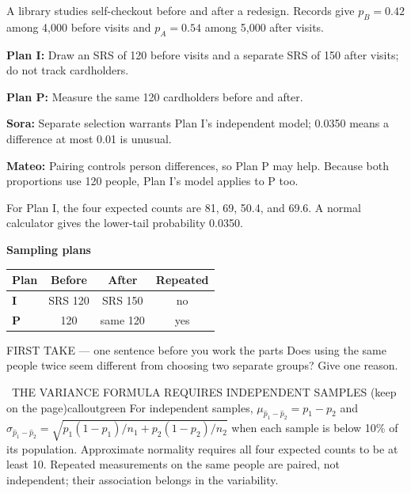 \documentclass[11pt]{article}
\begin{document}


A library studies self-checkout before and after a redesign. Records give $p_B=0.42$ among 4{,}000 before visits and $p_A=0.54$ among 5{,}000 after visits.\par\smallskip \textbf{Plan I:} Draw an SRS of 120 before visits and a separate SRS of 150 after visits; do not track cardholders.\par \textbf{Plan P:} Measure the same 120 cardholders before and after.\par\smallskip \textbf{Sora:} Separate selection warrants Plan I's independent model; 0.0350 means a difference at most 0.01 is unusual.\par \textbf{Mateo:} Pairing controls person differences, so Plan P may help. Because both proportions use 120 people, Plan I's model applies to P too.\par\smallskip For Plan I, the four expected counts are 81, 69, 50.4, and 69.6. A normal calculator gives the lower-tail probability 0.0350.\par
\begin{center}
\textbf{Sampling plans}\par\smallskip
\begin{tabular}{|l|c|c|c|}
\hline
\textbf{Plan} & \textbf{Before} & \textbf{After} & \textbf{Repeated} \\ \hline
\textbf{I} & SRS 120 & SRS 150 & no \\ \hline
\textbf{P} & 120 & same 120 & yes \\ \hline
\end{tabular}
\end{center}
\begin{firsttakebox}{FIRST TAKE --- one sentence before you work the parts}
Does using the same people twice seem different from choosing two separate groups? Give one reason.
\workspace{0.9in}
\end{firsttakebox}

\begin{callout}{\IconBook\ THE VARIANCE FORMULA REQUIRES INDEPENDENT SAMPLES (keep on the page)}{calloutgreen}
For independent samples, $\mu_{\widehat p_1-\widehat p_2}=p_1-p_2$ and
$\sigma_{\widehat p_1-\widehat p_2}=\sqrt{p_1(1-p_1)/n_1+p_2(1-p_2)/n_2}$ when each sample is
below 10\% of its population. Approximate normality requires all four expected counts to be at least 10.
Repeated measurements on the same people are paired, not independent; their association belongs in the variability.
\end{callout}
\end{document}
